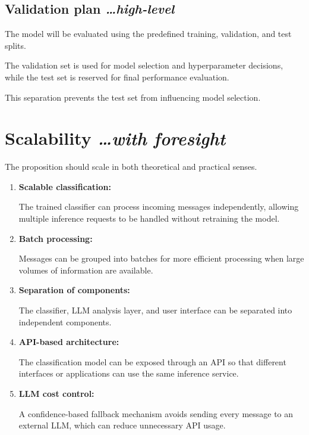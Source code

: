 \documentclass[11pt,a4paper]{article}
\newcommand{\BvrHint}[1]{%
  {\normalfont\normalsize\itshape\hfill #1}}
\begin{document}
\subsection{Validation plan %
\BvrHint{\ldots high-level}}

The model will be evaluated using the predefined training, validation, and
test splits.

The validation set is used for model selection and hyperparameter decisions,
while the test set is reserved for final performance evaluation.

This separation prevents the test set from influencing model selection.


\section{Scalability %
\BvrHint{\ldots with foresight}}

The proposition should scale in both theoretical and practical senses.

\begin{enumerate}[leftmargin=0.7cm]

    \item \textbf{Scalable classification:}

    The trained classifier can process incoming messages independently,
    allowing multiple inference requests to be handled without retraining the
    model.

    \item \textbf{Batch processing:}

    Messages can be grouped into batches for more efficient processing when
    large volumes of information are available.

    \item \textbf{Separation of components:}

    The classifier, LLM analysis layer, and user interface can be separated
    into independent components.

    \item \textbf{API-based architecture:}

    The classification model can be exposed through an API so that different
    interfaces or applications can use the same inference service.

    \item \textbf{LLM cost control:}

    A confidence-based fallback mechanism avoids sending every message to an
    external LLM, which can reduce unnecessary API usage.

\end{enumerate}
\end{document}
